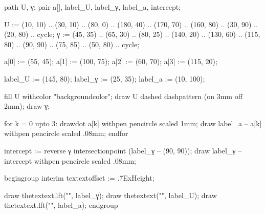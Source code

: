 \startenvironment[images]

\environment[colors]

  path U, γ;
  pair a[], label_U, label_γ, label_a, intercept;

  U := (10, 10) .. (30, 10) .. (80, 0) .. (180, 40) .. (170, 70) .. (160, 80)
    .. (30, 90) .. (20, 80) .. cycle;
  γ := (45, 35) .. (65, 30) .. (80, 25) .. (140, 20) .. (130, 60) .. (115, 80)
    .. (90, 90) .. (75, 85) .. (50, 80) .. cycle;

  a[0] := (55, 45);
  a[1] := (100, 75);
  a[2] := (60, 70);
  a[3] := (115, 20);

  label_U := (145, 80);
  label_γ := (25, 35);
  label_a := (10, 100);

  fill U withcolor "backgroundcolor";
  draw U dashed dashpattern (on 3mm off 2mm);
  draw γ;

  for k = 0 upto 3:
    drawdot a[k] withpen pencircle scaled 1mm;
    draw label_a -- a[k] withpen pencircle scaled .08mm;
  endfor

  intercept := reverse γ intersectionpoint (label_γ -- (90, 90));
  draw label_γ -- intercept withpen pencircle scaled .08mm;

  begingroup
    interim textextoffset := .7ExHeight;

    draw thetextext.lft("", label_γ);
    draw thetextext("", label_U);
    draw thetextext.lft("", label_a);
  endgroup
\stopuseMPgraphic

\stopenvironment
